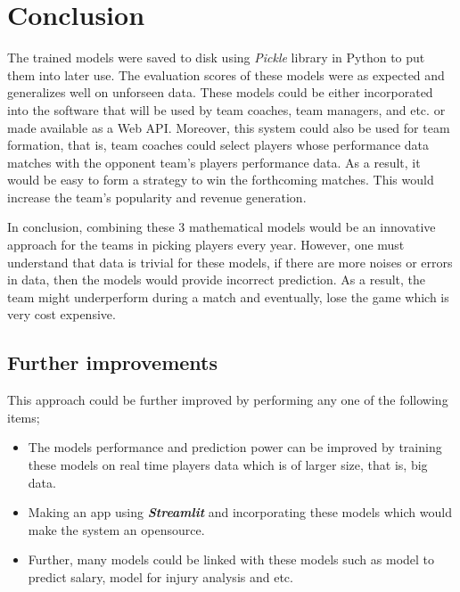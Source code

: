 \documentclass[format=sigconf]{acmart}
\begin{document}
\section{Conclusion}
The trained models were saved to disk using \textit{Pickle} library in Python to put them into later use. The evaluation scores 
of these models were as expected and generalizes well on unforseen data. These models could be either incorporated into the software 
that will be used by team coaches, team managers, and etc. or made available as a Web API. Moreover, this system could also be used 
for team formation, that is, team coaches could select players whose performance data matches with the opponent team's players
performance data. As a result, it would be easy to form a strategy to win the forthcoming matches. This would increase the team's 
popularity and revenue generation.

In conclusion, combining these 3 mathematical models would be an innovative approach for the teams in picking players every year.
However, one must understand that data is trivial for these models, if there are more noises or errors in data, then the models 
would provide incorrect prediction. As a result, the team might underperform during a match and eventually, lose the game which is 
very cost expensive.

\subsection{Further improvements}
This approach could be further improved by performing any one of the following items;
\begin{itemize}
    \item The models performance and prediction power can be improved by training these models on real time players data which is of 
    larger size, that is, big data.
    \item Making an app using \textit{\textbf{Streamlit}} and incorporating these models which would make the system an opensource.
    \item Further, many models could be linked with these models such as model to predict salary, model for injury analysis and etc.
\end{itemize}


\end{document}
